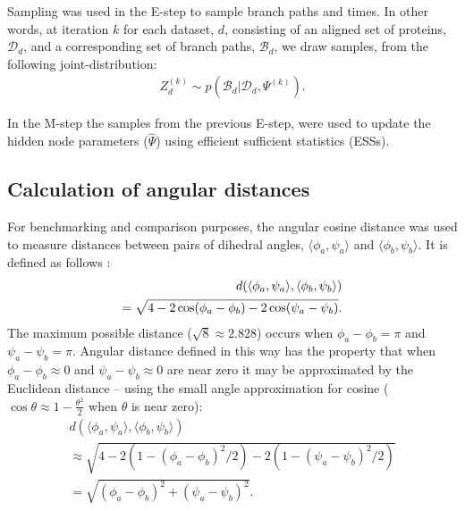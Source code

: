 \documentclass[nogrid]{MBE}%
\begin{document}
Sampling was used in the E-step to sample branch paths and times. In other words, at iteration $k$ for each dataset, $d$, consisting of an aligned set of proteins, $\mathcal{D}_d$,  and a corresponding set of branch paths, $\mathcal{B}_d$, we draw samples, from the following joint-distribution:
\begin{align*}
Z_{d}^{(k)}\sim p(\mathcal{B}_d|\mathcal{D}_d,\Psi^{(k)}).
\end{align*}

In the M-step the samples from the previous E-step, were used to update the hidden node parameters ($\hat{\Psi}$) using efficient sufficient statistics (ESSs).

\subsection{Calculation of angular distances}\label{sec:angulardistance}
For benchmarking and comparison purposes, the angular cosine distance was used to measure distances between pairs of dihedral angles, $\langle\phi_{a},\psi_{a}\rangle$ and $\langle\phi_{b},\psi_{b}\rangle$. It is defined as follows \citep{downs2002circular}:
\begin{align}
d(\langle\phi_{a},\psi_{a}\rangle,\langle\phi_{b},\psi_{b}\rangle)\notag\\
=\sqrt{4-2\cos(\phi_{a}-\phi_{b})-2\cos(\psi_{a}-\psi_{b})}.
\label{eq:angular_distance}
\end{align}
The maximum possible distance ($\sqrt{8} \approx 2.828$) occurs when $\phi_{a}-\phi_{b}=\pi$ and  $\psi_{a}-\psi_{b}=\pi$. Angular distance defined in this way has the property that when $\phi_{a}-\phi_{b}\approx 0$ and $\psi_{a}-\psi_{b}\approx 0$ are near zero it may be approximated by the Euclidean distance -- using the small angle approximation for cosine ($\cos\theta\approx1-\frac{\theta^{2}}{2}$  when $\theta$ is near zero):
\begin{align*}
d(\langle\phi_{a},\psi_{a}\rangle,\langle\phi_{b},\psi_{b}\rangle)\\ \approx\sqrt{4-2(1-(\phi_{a}-\phi_{b})^{2}/2)-2(1-(\psi_{a}-\psi_{b})^{2}/2)}\\
=\sqrt{(\phi_{a}-\phi_{b})^{2}+(\psi_{a}-\psi_{b})^{2}}.
\end{align*}
\end{document}
